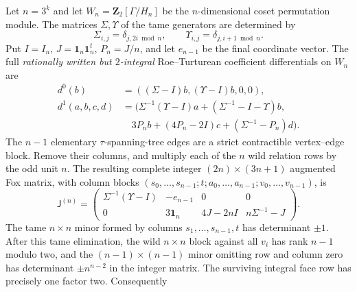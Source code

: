 \begin{theorem}
\label{thm:dyadic-f135-n-sheet-fox-matrix}
Let $n=3^k$ and let
$W_n=\mathbf Z_2[\Gamma/H_n]$
be the $n$-dimensional
coset permutation module.
The matrices $\Sigma,\Upsilon$
of the tame generators
are determined by
\begin{equation}\label{eq:dyadic-f135-coset-permutation-matrices}
\boxed{
\Sigma_{i,j}=\delta_{j,2i\bmod n},
\qquad
\Upsilon_{i,j}=\delta_{j,i+1\bmod n}.
}
\end{equation}
Put $I=I_n$,
$J=\mathbf1_n\mathbf1_n^t$,
$P_n=J/n$,
and let $e_{n-1}$ be
the final coordinate vector.
The full \emph{rationally
written but $2$-integral}
Roe--Turturean coefficient
differentials on
$W_n$ are
\begin{equation}\label{eq:dyadic-f135-full-n-sheet-fox-differentials}
\boxed{
\begin{aligned}
d^0(b)&=((\Sigma-I)b,
(\Upsilon-I)b,0,0),\\
d^1(a,b,c,d)
&=\bigl(
\Sigma^{-1}(\Upsilon-I)a+
(\Sigma^{-1}-I-\Upsilon)b,\\
&\hspace{1em}
3P_n b+(4P_n-2I)c+
(\Sigma^{-1}-P_n)d
\bigr).
\end{aligned}}
\end{equation}
The $n-1$ elementary
$\tau$-spanning-tree edges
are a strict contractible
vertex--edge block.
Remove their columns,
and multiply each
of the $n$ wild
relation rows by the
odd unit $n$.
The resulting
complete integer
$(2n)\times(3n+1)$
augmented Fox matrix,
with column blocks
$(s_0,\ldots,s_{n-1};
t;a_0,\ldots,a_{n-1};
v_0,\ldots,v_{n-1})$,
is
\begin{equation}\label{eq:dyadic-f135-n-sheet-augmented-matrix}
\boxed{
\mathsf J^{(n)}=
\begin{pmatrix}
\Sigma^{-1}(\Upsilon-I)
&-e_{n-1}&0&0\\[2pt]
0&3\mathbf1_n&
4J-2nI&
n\Sigma^{-1}-J
\end{pmatrix}.
}
\end{equation}
The tame $n\times n$
minor formed by columns
$s_1,\ldots,s_{n-1},t$
has determinant $\pm1$.
After this tame elimination,
the wild $n\times n$
block against all $v_i$
has rank $n-1$ modulo two,
and the $(n-1)\times(n-1)$
minor omitting row and column
zero has determinant
$\pm n^{n-2}$ in the
integer matrix.
The surviving
integral face row has
precisely one factor two.
Consequently
\begin{equation}\label{eq:dyadic-f135-uniform-smith-invariants}

\end{equation}
\end{theorem}
